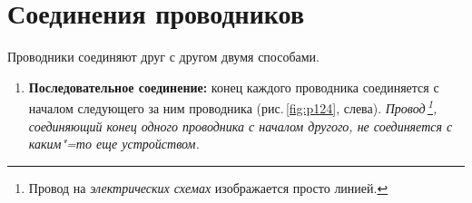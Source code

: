 \documentclass[main.tex]{subfiles}
\begin{document}

\pagestyle{empty}

 

\setcounter{section}{20
}
\addtocounter{section}{-1} 

\section{Соединения проводников}


Проводники соединяют друг с другом двумя способами. 
\begin{enumerate}
    \item \textbf{Последовательное соединение:} конец каждого проводника соединяется с началом следующего за ним проводника (рис.\,\ref{fig:p124}, слева). \emph{Провод\,\footnote{Провод на \emph{электрических схемах} изображается просто линией.}, соединяющий конец одного проводника с началом другого, не соединяется с каким"=то еще устройством.}
    




    



\end{enumerate}
\end{document}
